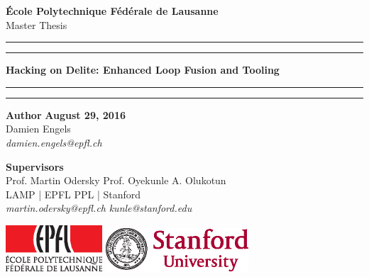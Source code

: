 
\begin{titlepage}
\begin{center}
\Large
\textbf{École Polytechnique Fédérale de Lausanne} \\
\vspace{1cm}
Master Thesis
\vspace{2cm}
\hrule
\vspace{0.1cm}
\hrule
\vspace{1cm}
\Huge
\textbf{Hacking on Delite: Enhanced Loop Fusion and Tooling} \\
\vspace{1cm}
\hrule
\vspace{0.1cm}
\hrule
\end{center}
\vfill
\noindent \textbf{Author} \hfill \textbf{August 29, 2016} \\
Damien Engels \\
\textit{damien.engels@epfl.ch} \\
\vspace{0.5cm}

\noindent \textbf{Supervisors} \\
Prof. Martin Odersky            \hfill    Prof. Oyekunle A. Olukotun \\
LAMP | EPFL                     \hfill    PPL | Stanford \\
\textit{martin.odersky@epfl.ch} \hfill    \textit{kunle@stanford.edu} \\
\vspace{0.8cm}

\noindent
\includegraphics[width=0.27\textwidth]{images/epfl-logo.eps}
\hfill
\includegraphics[width=0.4\textwidth]{images/stanford-logo.eps}

\end{titlepage}

\newpage
\null
\thispagestyle{empty}
\newpage
